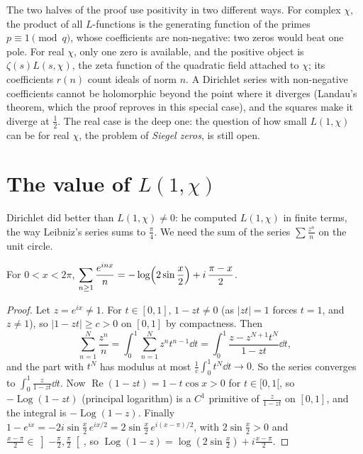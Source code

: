 \begin{beauty}
The two halves of the proof use positivity in two different ways. For complex $\chi$, the product of all $L$-functions is the
generating function of the primes $p\equiv1\pmod q$, whose coefficients are non-negative: two zeros would beat one pole. For real $\chi$, only one
zero is available, and the positive object is $\zeta(s)L(s,\chi)$, the zeta function of the quadratic field attached to $\chi$; its coefficients
$r(n)$ count ideals of norm $n$. A Dirichlet series with non-negative coefficients cannot be holomorphic beyond the point where it
diverges (Landau's theorem, which the proof reproves in this special case), and the squares make it diverge at $\frac12$. The real case is the
deep one: the question of how small $L(1,\chi)$ can be for real $\chi$, the problem of \emph{Siegel zeros}, is still open.
\end{beauty}

\section{The value of \texorpdfstring{$L(1,\chi)$}{L(1,chi)}}

Dirichlet did better than $L(1,\chi)\ne0$: he computed $L(1,\chi)$ in finite terms, the way Leibniz's series sums to $\frac\pi4$. We need the sum of the series $\sum\frac{z^n}n$ on the unit circle.

\begin{lemma}\label{lem:logseries}
For $0<x<2\pi$, $\displaystyle\sum_{n\ge1}\frac{e^{inx}}n=-\log\Bigl(2\sin\frac x2\Bigr)+i\,\frac{\pi-x}2$.
\end{lemma}
\begin{proof}
Let $z=e^{ix}\ne1$. For $t\in[0,1]$, $1-zt\ne0$ (as $|zt|=1$ forces $t=1$, and $z\ne1$), so $|1-zt|\ge c>0$ on $[0,1]$ by compactness. Then
\[
\sum_{n=1}^N\frac{z^n}n=\int_0^1\sum_{n=1}^Nz^nt^{n-1}\dd t=\int_0^1\frac{z-z^{N+1}t^N}{1-zt}\dd t,
\]
and the part with $t^N$ has modulus at most $\frac1c\int_0^1t^N\dd t\to0$. So the series converges to $\int_0^1\frac z{1-zt}\dd t$. Now $\operatorname{Re}(1-zt)=1-t\cos x>0$
for $t\in[0,1[$, so $-\operatorname{Log}(1-zt)$ (principal logarithm) is a $C^1$ primitive of $\frac z{1-zt}$ on $[0,1]$, and the integral is $-\operatorname{Log}(1-z)$. Finally
$1-e^{ix}=-2i\sin\frac x2\,e^{ix/2}=2\sin\frac x2\,e^{i(x-\pi)/2}$, with $2\sin\frac x2>0$ and $\frac{x-\pi}2\in\left]-\frac\pi2,\frac\pi2\right[$, so $\operatorname{Log}(1-z)=\log(2\sin\frac x2)+i\frac{x-\pi}2$.
\end{proof}


